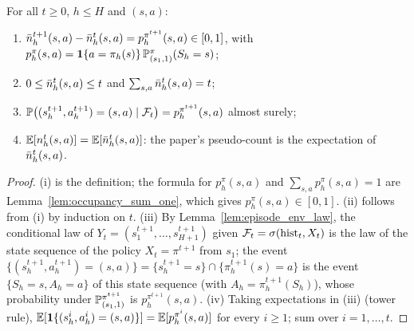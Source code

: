 \begin{lemma}\label{lem:pseudo_counts_increments}
\leanok
{}
For all $t \ge 0$, $h \le H$ and $(s, a)$:
\begin{enumerate}
  \item[(i)] $\bar{n}_h^{t+1}(s, a) - \bar{n}_h^t(s, a) = p^{\pi^{t+1}}_h(s, a) \in [0, 1]$, with
        $p^{\pi}_h(s, a) = \mathbf{1}\{a = \pi_h(s)\}\, \mathbb{P}^\pi_{(s_1, 1)}(S_h = s)$;
  \item[(ii)] $0 \le \bar{n}_h^t(s, a) \le t$ and $\sum_{s, a} \bar{n}_h^t(s, a) = t$;
  \item[(iii)] $\mathbb{P}\big((s^{t+1}_h, a^{t+1}_h) = (s, a) \mid \mathcal F_t\big) = p^{\pi^{t+1}}_h(s, a)$
        almost surely;
  \item[(iv)] $\mathbb{E}[n_h^t(s, a)] = \mathbb{E}[\bar{n}_h^t(s, a)]$: the paper's pseudo-count is the expectation
        of $\bar{n}_h^t(s, a)$.
\end{enumerate}
\end{lemma}

\begin{proof}
\leanok
(i) is the definition; the formula for $p^\pi_h(s, a)$ and $\sum_{s, a} p^\pi_h(s, a) = 1$ are
Lemma~\ref{lem:occupancy_sum_one}, which gives $p^\pi_h(s, a) \in [0, 1]$. (ii) follows from
(i) by induction on $t$. (iii) By Lemma~\ref{lem:episode_env_law}, the conditional law of
$Y_t = (s^{t+1}_1, \dots, s^{t+1}_{H+1})$ given $\mathcal F_t = \sigma(\mathrm{hist}_t, X_t)$ is the law of
the state sequence of the policy $X_t = \pi^{t+1}$ from $s_1$; the event
$\{(s^{t+1}_h, a^{t+1}_h) = (s, a)\} = \{s^{t+1}_h = s\} \cap \{\pi^{t+1}_h(s) = a\}$ is the
event $\{S_h = s, A_h = a\}$ of this state sequence (with $A_h = \pi^{t+1}_h(S_h)$), whose
probability under $\mathbb{P}^{\pi^{t+1}}_{(s_1, 1)}$ is $p^{\pi^{t+1}}_h(s, a)$. (iv) Taking
expectations in (iii) (tower rule), $\mathbb{E}[\mathbf{1}\{(s^{i}_h, a^{i}_h) = (s, a)\}] = \mathbb{E}[p^{\pi^{i}}_h(s, a)]$
for every $i \ge 1$; sum over $i = 1, \dots, t$.
\end{proof}

